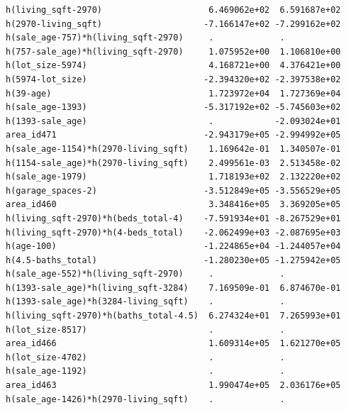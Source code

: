 \documentclass[
]{article}
\begin{document}
\begin{verbatim}
h(living_sqft-2970)                     6.469062e+02  6.591687e+02
h(2970-living_sqft)                    -7.166147e+02 -7.299162e+02
h(sale_age-757)*h(living_sqft-2970)     .             .           
h(757-sale_age)*h(living_sqft-2970)     1.075952e+00  1.106810e+00
h(lot_size-5974)                        4.168721e+00  4.376421e+00
h(5974-lot_size)                       -2.394320e+02 -2.397538e+02
h(39-age)                               1.723972e+04  1.727369e+04
h(sale_age-1393)                       -5.317192e+02 -5.745603e+02
h(1393-sale_age)                        .            -2.093024e+01
area_id471                             -2.943179e+05 -2.994992e+05
h(sale_age-1154)*h(2970-living_sqft)    1.169642e-01  1.340507e-01
h(1154-sale_age)*h(2970-living_sqft)    2.499561e-03  2.513458e-02
h(sale_age-1979)                        1.718193e+02  2.132220e+02
h(garage_spaces-2)                     -3.512849e+05 -3.556529e+05
area_id460                              3.348416e+05  3.369205e+05
h(living_sqft-2970)*h(beds_total-4)    -7.591934e+01 -8.267529e+01
h(living_sqft-2970)*h(4-beds_total)    -2.062499e+03 -2.087695e+03
h(age-100)                             -1.224865e+04 -1.244057e+04
h(4.5-baths_total)                     -1.280230e+05 -1.275942e+05
h(sale_age-552)*h(living_sqft-2970)     .             .           
h(1393-sale_age)*h(living_sqft-3284)    7.169509e-01  6.874670e-01
h(1393-sale_age)*h(3284-living_sqft)    .             .           
h(living_sqft-2970)*h(baths_total-4.5)  6.274324e+01  7.265993e+01
h(lot_size-8517)                        .             .           
area_id466                              1.609314e+05  1.621270e+05
h(lot_size-4702)                        .             .           
h(sale_age-1192)                        .             .           
area_id463                              1.990474e+05  2.036176e+05
h(sale_age-1426)*h(2970-living_sqft)    .             .           
                                                                  

\end{verbatim}
\end{document}
